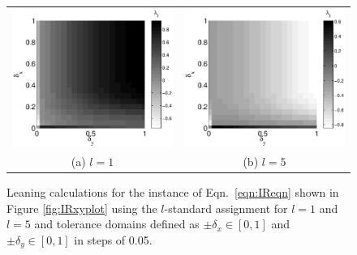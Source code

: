 \documentclass{article}[10pt]
\begin{document}
\begin{figure}[ht]
\begin{tabular}{cc}
\includegraphics[scale=0.70]{NoisyResponseExample_leandifftoll1.eps} & \includegraphics[scale=0.70]{NoisyResponseExample_leandifftoll5.eps} \\
(a) $l=1$ & (b) $l=5$
\end{tabular}
\caption{Leaning calculations for the instance of Eqn.\ \ref{eqn:IReqn} shown in Figure \ref{fig:IRxyplot} using the $l$-standard assignment for $l=1$ and $l=5$ and tolerance domains defined as $\pm\delta_x\in[0,1]$ and $\pm\delta_y\in[0,1]$ in steps of 0.05.}
\label{fig:IRxyLtoldomains}
\end{figure}
\end{document}
